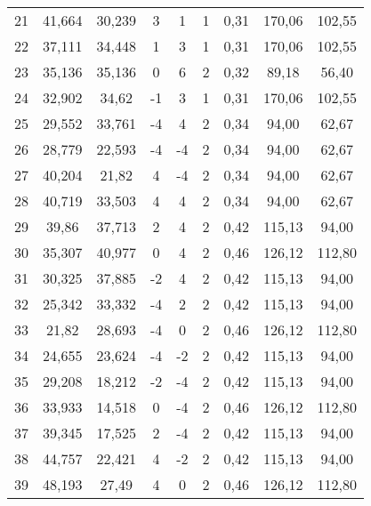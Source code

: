 \begin{table}[h]
\begin{tabular}{ccccccccc}
21 & 41,664 & 30,239 & 3 & 1 & 1 & 0,31 & 170,06 & 102,55\\
22 & 37,111 & 34,448 & 1 & 3 & 1 & 0,31 & 170,06 & 102,55\\
23 & 35,136 & 35,136 & 0 & 6 & 2 & 0,32 & 89,18 & 56,40\\
24 & 32,902 & 34,62 & -1 & 3 & 1 & 0,31 & 170,06 & 102,55\\
25 & 29,552 & 33,761 & -4 & 4 & 2 & 0,34 & 94,00 & 62,67\\
26 & 28,779 & 22,593 & -4 & -4 & 2 & 0,34 & 94,00 & 62,67\\
27 & 40,204 & 21,82 & 4 & -4 & 2 & 0,34 & 94,00 & 62,67\\
28 & 40,719 & 33,503 & 4 & 4 & 2 & 0,34 & 94,00 & 62,67\\
29 & 39,86 & 37,713 & 2 & 4 & 2 & 0,42 & 115,13 & 94,00\\
30 & 35,307 & 40,977 & 0 & 4 & 2 & 0,46 & 126,12 & 112,80\\
31 & 30,325 & 37,885 & -2 & 4 & 2 & 0,42 & 115,13 & 94,00\\
32 & 25,342 & 33,332 & -4 & 2 & 2 & 0,42 & 115,13 & 94,00\\
33 & 21,82 & 28,693 & -4 & 0 & 2 & 0,46 & 126,12 & 112,80\\
34 & 24,655 & 23,624 & -4 & -2 & 2 & 0,42 & 115,13 & 94,00\\
35 & 29,208 & 18,212 & -2 & -4 & 2 & 0,42 & 115,13 & 94,00\\
36 & 33,933 & 14,518 & 0 & -4 & 2 & 0,46 & 126,12 & 112,80\\
37 & 39,345 & 17,525 & 2 & -4 & 2 & 0,42 & 115,13 & 94,00\\
38 & 44,757 & 22,421 & 4 & -2 & 2 & 0,42 & 115,13 & 94,00\\
39 & 48,193 & 27,49 & 4 & 0 & 2 & 0,46 & 126,12 & 112,80\\
\bottomrule
\end{tabular}
\end{table}
